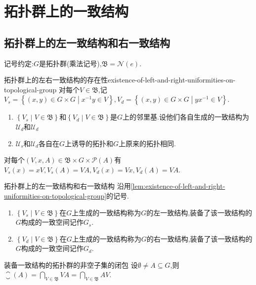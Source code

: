 \chapter{拓扑群上的一致结构}

\section{拓扑群上的左一致结构和右一致结构}

记号约定:$G$是拓扑群(乘法记号),$\mathfrak{B}=\mathcal{N}\left(e\right)$.

\begin{lemma}{拓扑群上的左右一致结构的存在性}{existence-of-left-and-right-uniformities-on-topological-group}
	对每个$V\in\mathfrak{B}$,记$V_{s}=\left\{\left(x,y\right)\in G\times G\middle|x^{-1}y\in V\right\},V_{d}=\left\{\left(x,y\right)\in G\times G\middle|yx^{-1}\in V\right\}$.
	\begin{enumerate}
		\item $\left\{V_{s}\middle|V\in\mathfrak{B}\right\}$和$\left\{V_{d}\middle|V\in\mathfrak{B}\right\}$是$G$上的邻里基.设他们各自生成的一致结构为$\mathcal{U}_{d}$和$\mathcal{U}_{d}$
		\item $\mathcal{U}_{s}$和$\mathcal{U}_{d}$各自在$G$上诱导的拓扑和$G$上原来的拓扑相同.
	\end{enumerate}
\end{lemma}

\begin{remark}{}{}
	对每个$\left(V,x,A\right)\in\mathfrak{B}\times G\times\mathcal{P}\left(A\right)$有$V_{s}\left(x\right)=xV,V_{s}\left(A\right)=VA,V_{d}\left(x\right)=Vx,V_{d}\left(A\right)=VA$.
\end{remark}

\begin{definition}{拓扑群上的左一致结构和右一致结构}{}
	沿用\cref{lem:existence-of-left-and-right-uniformities-on-topological-group}的记号.
	\begin{enumerate}
		\item $\left\{V_{s}\middle|V\in\mathfrak{B}\right\}$在$G$上生成的一致结构称为$G$的左一致结构,装备了该一致结构的$G$构成的一致空间记作$G_{s}$.
		\item $\left\{V_{d}\middle|V\in\mathfrak{B}\right\}$在$G$上生成的一致结构称为$G$的右一致结构,装备了该一致结构的$G$构成的一致空间记作$G_{d}$.
	\end{enumerate}
\end{definition}

\begin{corollary}{装备一致结构的拓扑群的非空子集的闭包}{}
	设$\emptyset\neq A\subseteq G$,则$\closure\left(A\right)=\bigcap\limits_{V\in\mathfrak{B}}VA=\bigcap\limits_{V\in\mathfrak{B}}AV$.
\end{corollary}

